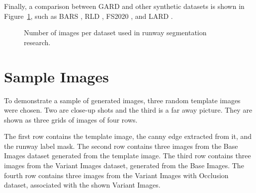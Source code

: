 Finally, a comparison between GARD and other synthetic datasets is shown in
Figure~\ref{fig:dataset_image_counts}, such as BARS \cite{chen_bars_2023},
RLD \cite{wang_valnet_2024}, FS2020 \cite{chen_image-based_2024}, and LARD
\cite{ducoffe_lard_2023}.

\begin{figure}[htbp]
\centering
{}
\caption{Number of images per dataset used in runway segmentation research.}
\label{fig:dataset_image_counts}
\end{figure}



\FloatBarrier
\section{Sample Images}

To demonstrate a sample of generated images, three random template images were
chosen. Two are close-up shots and the third is a far away picture. They
are shown as three grids of images of four rows.

The first row contains the template image, the canny edge extracted from it,
and the runway label mask. The second row contains three images from the Base
Images dataset generated from the template image. The third row contains three
images from the Variant Images dataset, generated from the Base Images. The
fourth row contains three images from the Variant Images with Occlusion dataset,
associated with the shown Variant Images.

